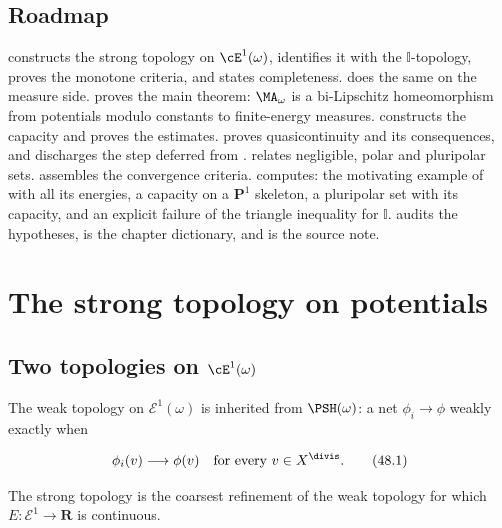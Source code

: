 \subsection{Roadmap}
\label{sec:ch48-roadmap}

 constructs the strong topology on
$\cE^1(\omega)$, identifies it with the $\mathbb I$-topology, proves the
monotone criteria, and states completeness.
 does the same on the measure side.
 proves the main theorem: $\MA_\omega$ is a
bi-Lipschitz homeomorphism from potentials modulo constants to
finite-energy measures.
 constructs the capacity and proves the estimates.
 proves quasicontinuity and its
consequences, and discharges the step deferred from
.
 relates negligible, polar and pluripolar sets.
 assembles the convergence criteria.
 computes: the motivating example of
 with all its energies, a capacity on a
$\mathbf P^1$ skeleton, a pluripolar set with its capacity, and an
explicit failure of the triangle inequality for $\mathbb I$.
 audits the hypotheses,
 is the chapter dictionary, and
 is the source note.

\section{The strong topology on potentials}
\label{sec:ch48-potentials}

\subsection{Two topologies on \texorpdfstring{$\cE^1(\omega)$}{E1}}
\label{sec:ch48-two-topologies}

\begin{definition}
\label{def:bj-strong-e1}
The weak topology on $\mathcal E^1(\omega)$ is inherited from
$\PSH(\omega)$: a net $\phi_i\to\phi$ weakly exactly when

\[
                       \phi_i(v)\longrightarrow\phi(v)
          \quad\text{for every }v\in X^{\divis}.
\tag{48.1}\label{eq:bj-e1-weak}
\]

The strong topology is the coarsest refinement of the weak topology for
which $E:\mathcal E^1\to\mathbf R$ is continuous.
\end{definition}

